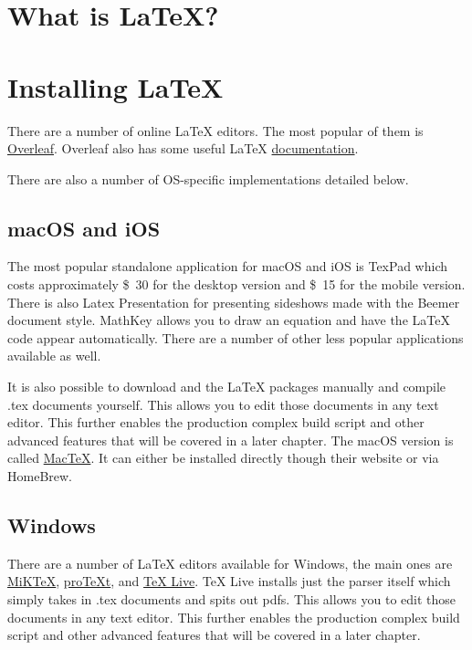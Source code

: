 \section{What is \LaTeX?}

\section{Installing \LaTeX}
There are a number of online \LaTeX{} editors. The most popular of them is \href{https://www.overleaf.com}{Overleaf}. Overleaf also has some useful \LaTeX{} \href{https://www.overleaf.com/learn}{documentation}.\par
There are also a number of OS-specific implementations detailed below.

\subsection{macOS and iOS}
The most popular standalone application for macOS and iOS is TexPad which costs approximately \SI{30}[\$]{} for the desktop version and \SI{15}[\$]{} for the mobile version. There is also Latex Presentation for presenting sideshows made with the Beemer document style. MathKey allows you to draw an equation and have the \LaTeX{} code appear automatically. There are a number of other less popular applications available as well.\par
It is also possible to download and the \LaTeX{} packages manually and compile .tex documents yourself. This allows you to edit those documents in any text editor. This further enables the production complex build script and other advanced features that will be covered in a later chapter. The macOS version is called \href{http://www.tug.org/mactex/}{MacTeX}. It can either be installed directly though their website or via HomeBrew. 

\subsection{Windows}
There are a number of \LaTeX{} editors available for Windows, the main ones are \href{https://miktex.org/}{MiKTeX}, \href{http://www.tug.org/protext/}{proTeXt}, and \href{http://www.tug.org/texlive/}{TeX Live}. TeX Live installs just the parser itself which simply takes in .tex documents and spits out pdfs. This allows you to edit those documents in any text editor. This further enables the production complex build script and other advanced features that will be covered in a later chapter.

